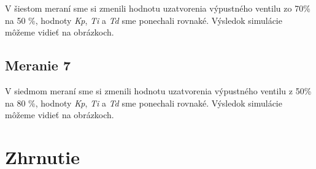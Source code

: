 \documentclass{article}
\begin{document}
V šiestom meraní sme si zmenili hodnotu uzatvorenia výpustného ventilu zo 70\% na 50 \%, hodnoty
\textit{Kp}, \textit{Ti} a \textit{Td} sme ponechali rovnaké. Výsledok simulácie môžeme vidieť na obrázkoch.


\clearpage

\subsection{Meranie 7}
\label{sec:meranie7}

V siedmom meraní sme si zmenili hodnotu uzatvorenia výpustného ventilu z 50\% na 80 \%, hodnoty
\textit{Kp}, \textit{Ti} a \textit{Td} sme ponechali rovnaké. Výsledok simulácie môžeme vidieť na obrázkoch.


\clearpage

\section{Zhrnutie}
\label{sec:zhrnutie}

\end{document}
